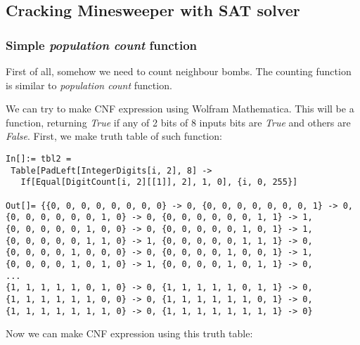 \subsection{Cracking Minesweeper with SAT solver}
\label{minesweeper_SAT}

\renewcommand{\CURPATH}{equations/minesweeper_SAT}

\subsubsection{Simple \textit{population count} function}

First of all, somehow we need to count neighbour bombs.
The counting function is similar to \textit{population count} function.

We can try to make \ac{CNF} expression using Wolfram Mathematica.
This will be a function, returning \textit{True}
if any of 2 bits of 8 inputs bits are \textit{True} and others are \textit{False}.
First, we make truth table of such function:

\begin{lstlisting}
In[]:= tbl2 = 
 Table[PadLeft[IntegerDigits[i, 2], 8] -> 
   If[Equal[DigitCount[i, 2][[1]], 2], 1, 0], {i, 0, 255}]

Out[]= {{0, 0, 0, 0, 0, 0, 0, 0} -> 0, {0, 0, 0, 0, 0, 0, 0, 1} -> 0, 
{0, 0, 0, 0, 0, 0, 1, 0} -> 0, {0, 0, 0, 0, 0, 0, 1, 1} -> 1, 
{0, 0, 0, 0, 0, 1, 0, 0} -> 0, {0, 0, 0, 0, 0, 1, 0, 1} -> 1, 
{0, 0, 0, 0, 0, 1, 1, 0} -> 1, {0, 0, 0, 0, 0, 1, 1, 1} -> 0, 
{0, 0, 0, 0, 1, 0, 0, 0} -> 0, {0, 0, 0, 0, 1, 0, 0, 1} -> 1, 
{0, 0, 0, 0, 1, 0, 1, 0} -> 1, {0, 0, 0, 0, 1, 0, 1, 1} -> 0, 
...
{1, 1, 1, 1, 1, 0, 1, 0} -> 0, {1, 1, 1, 1, 1, 0, 1, 1} -> 0, 
{1, 1, 1, 1, 1, 1, 0, 0} -> 0, {1, 1, 1, 1, 1, 1, 0, 1} -> 0, 
{1, 1, 1, 1, 1, 1, 1, 0} -> 0, {1, 1, 1, 1, 1, 1, 1, 1} -> 0}
\end{lstlisting}

Now we can make \ac{CNF} expression using this truth table:

